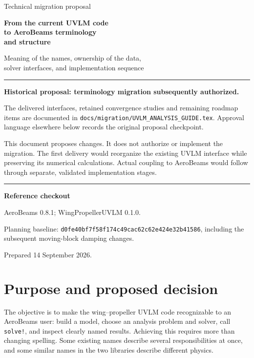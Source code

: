\documentclass[11pt,a4paper]{article}
\newcommand{\code}{\nolinkurl}
\begin{document}
\begin{titlepage}
\vspace*{18mm}
{\color{accent}\Large Technical migration proposal\par}
\vspace{8mm}
{\color{ink}\Huge\bfseries From the current UVLM code\\[3mm]
to AeroBeams terminology\\[3mm]
and structure\par}
\vspace{10mm}
{\Large Meaning of the names, ownership of the data,\\
solver interfaces, and implementation sequence\par}
\vspace{15mm}
\hrule
\vspace{5mm}
\textbf{Historical proposal: terminology migration subsequently authorized.}

The delivered interfaces, retained convergence studies and remaining roadmap
items are documented in \code{docs/migration/UVLM_ANALYSIS_GUIDE.tex}.
Approval language elsewhere below records the original proposal checkpoint.

This document proposes changes. It does not authorize or implement the migration.
The first delivery would reorganize the existing UVLM interface while preserving
its numerical calculations. Actual coupling to AeroBeams would follow through
separate, validated implementation stages.
\vspace{5mm}
\hrule
\vfill
\textbf{Reference checkout}\par
AeroBeams 0.8.1; WingPropellerUVLM 0.1.0.\par
Planning baseline: \code{d0fe40bf7f58f174c49cac62c62e424e32b41586},
including the subsequent moving-block damping changes.\par
Prepared 14 September 2026.
\end{titlepage}

\tableofcontents
\clearpage

\section{Purpose and proposed decision}
\label{sec:decision}

The objective is to make the wing--propeller UVLM code recognizable to an
AeroBeams user: build a model, choose an analysis problem and solver, call
\code{solve!}, and inspect clearly named results. Achieving this requires more
than changing spelling. Some existing names describe several responsibilities
at once, and some similar names in the two libraries describe different physics.
\end{document}
